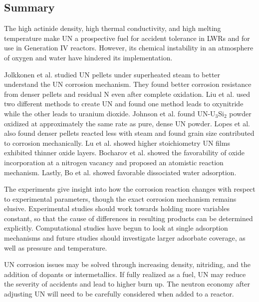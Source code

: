 \documentclass[11pt]{article}
\begin{document}
\begin{multicols}{2}
\section{Summary}
The high actinide density, high thermal conductivity, and high melting temperature make UN a prospective fuel for accident tolerance in LWRs and for use in Generation IV reactors. However, its chemical instability in an atmosphere of oxygen and water have hindered its implementation. 
\par Jolkkonen et al. \cite{Jolkkonen2017} studied UN pellets under superheated steam to better understand the UN corrosion mechanism. They found better corrosion resistance from denser pellets and residual N even after complete oxidation. Liu et al. \cite{Liu2013} used two different methods to create UN and found one method leads to oxynitride while the other leads to uranium dioxide. Johnson et al. \cite{Johnson2016} found UN-U$_{3}$Si$_{2}$ powder oxidized at approximately the same rate as pure, dense UN powder. Lopes et al. \cite{Lopes2017} also found denser pellets reacted less with steam and found grain size contributed to corrosion mechanically. Lu et al. showed higher stoichiometry UN films exhibited thinner oxide layers. Bocharov et al. \cite{Bocharov2013} showed the favorability of oxide incorporation at a nitrogen vacancy and proposed an atomistic reaction mechanism. Lastly, Bo et al. \cite{Bo2016} showed favorable dissociated water adsorption.
\par The experiments give insight into how the corrosion reaction changes with respect to experimental parameters, though the exact corrosion mechanism remains elusive. Experimental studies should work towards holding more variables constant, so that the cause of differences in resulting products can be determined explicitly. Computational studies have begun to look at single adsorption mechanisms and future studies should investigate larger adsorbate coverage, as well as pressure and temperature. 
\par 
UN corrosion issues may be solved through increasing density, nitriding, and the addition of dopants or intermetallics. If fully realized as a fuel, UN may reduce the severity of accidents and lead to higher burn up. The neutron economy after adjusting UN will need to be carefully considered when added to a reactor.








\end{multicols}
\end{document}
